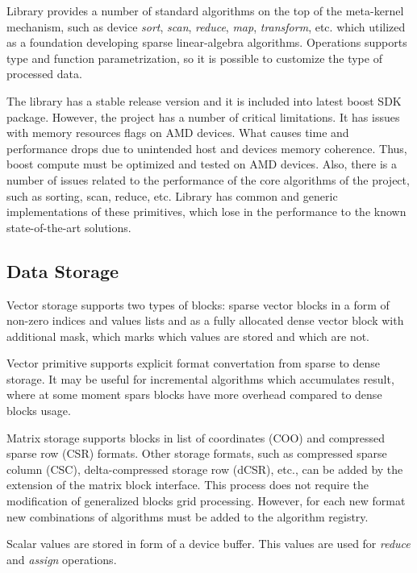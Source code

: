 Library provides a number of standard algorithms on the top of the meta-kernel mechanism, such as device \textit{sort}, \textit{scan}, \textit{reduce}, \textit{map}, \textit{transform}, etc. which utilized as a foundation developing sparse linear-algebra algorithms. Operations supports type and function parametrization, so it is possible to customize the type of processed data.

The library has a stable release version and it is included into latest boost SDK package. However, the project has a number of critical limitations. It has issues with memory resources flags on AMD devices. What causes time and performance drops due to unintended host and devices memory coherence. Thus, boost compute must be optimized and tested on AMD devices. Also, there is a number of issues related to the performance of the core algorithms of the project, such as sorting, scan, reduce, etc. Library has common and generic implementations of these primitives, which lose in the performance to the known state-of-the-art solutions.\\

\subsection{Data Storage}

Vector storage supports two types of blocks: sparse vector blocks in a form of non-zero indices and values lists and as a fully allocated dense vector block with additional mask, which marks which values are stored and which are not. 

Vector primitive supports explicit format convertation from sparse to dense storage. It may be useful for incremental algorithms which accumulates result, where at some moment spars blocks have more overhead compared to dense blocks usage.

Matrix storage supports blocks in list of coordinates (COO) and compressed sparse row (CSR) formats. Other storage formats, such as compressed sparse column (CSC), delta-compressed storage row (dCSR), etc., can be added by the extension of the matrix block interface. This process does not require the modification of generalized blocks grid processing. However, for each new format new combinations of algorithms must be added to the algorithm registry. 

Scalar values are stored in form of a device buffer. This values are used for \textit{reduce} and \textit{assign} operations.

